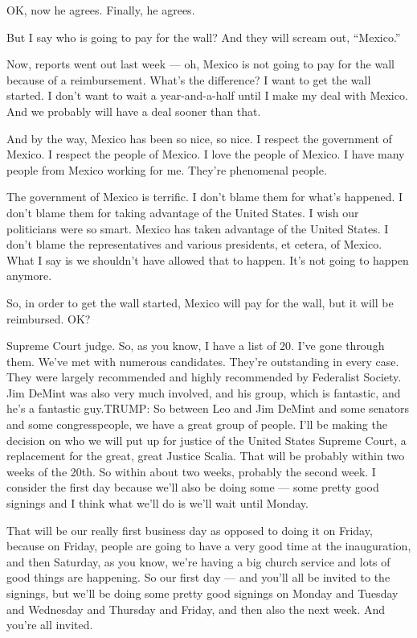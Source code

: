 OK, now he agrees. Finally, he agrees.

But I say who is going to pay for the wall? And they will scream out,
``Mexico.''

Now, reports went out last week --- oh, Mexico is not going to pay for
the wall because of a reimbursement. What's the difference? I want to
get the wall started. I don't want to wait a year-and-a-half until I
make my deal with Mexico. And we probably will have a deal sooner than
that.

And by the way, Mexico has been so nice, so nice. I respect the
government of Mexico. I respect the people of Mexico. I love the people
of Mexico. I have many people from Mexico working for me. They're
phenomenal people.

The government of Mexico is terrific. I don't blame them for what's
happened. I don't blame them for taking advantage of the United States.
I wish our politicians were so smart. Mexico has taken advantage of the
United States. I don't blame the representatives and various presidents,
et cetera, of Mexico. What I say is we shouldn't have allowed that to
happen. It's not going to happen anymore.

So, in order to get the wall started, Mexico will pay for the wall, but
it will be reimbursed. OK?

Supreme Court judge. So, as you know, I have a list of 20. I've gone
through them. We've met with numerous candidates. They're outstanding in
every case. They were largely recommended and highly recommended by
Federalist Society. Jim DeMint was also very much involved, and his
group, which is fantastic, and he's a fantastic guy.TRUMP: So between
Leo and Jim DeMint and some senators and some congresspeople, we have a
great group of people. I'll be making the decision on who we will put up
for justice of the United States Supreme Court, a replacement for the
great, great Justice Scalia. That will be probably within two weeks of
the 20th. So within about two weeks, probably the second week. I
consider the first day because we'll also be doing some --- some pretty
good signings and I think what we'll do is we'll wait until Monday.

That will be our really first business day as opposed to doing it on
Friday, because on Friday, people are going to have a very good time at
the inauguration, and then Saturday, as you know, we're having a big
church service and lots of good things are happening. So our first day
--- and you'll all be invited to the signings, but we'll be doing some
pretty good signings on Monday and Tuesday and Wednesday and Thursday
and Friday, and then also the next week. And you're all invited.

